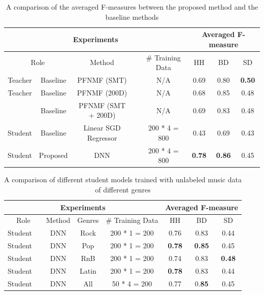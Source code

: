 \documentclass{article}
\begin{document}
\begin{table}
\centering
\begin{tabular}{ccccc|ccc}
\hline
\multicolumn{5}{c}{Experiments}                                                & \multicolumn{3}{c}{Averaged F-measure}           \\ \hline
\multicolumn{2}{c}{Role} & Method                  &  & \# Training Data & HH             & BD             & SD             \\ \hline
Teacher    & Baseline    & PFNMF (SMT)             &     & N/A              & 0.69          & 0.80           & \textbf{0.50} \\
Teacher    & Baseline    & PFNMF (200D)       &     & N/A              & 0.68          & 0.85          & 0.48          \\
           & Baseline    & PFNMF (SMT + 200D) &     & N/A              & 0.69          & 0.83          & 0.48          \\
Student    & Baseline    & Linear SGD Regressor    &     & 200 * 4 = 800    & 0.43          & 0.69           & 0.43          \\
Student    & Proposed    & DNN                     &     & 200 * 4 = 800    & \textbf{0.78} & \textbf{0.86} & 0.45          \\ \hline
\end{tabular}
\caption{A comparison of the averaged F-measures between the proposed method and the baseline methods}
\label{tab:all_results}
\end{table}

\begin{table}
\centering
\begin{tabular}{cccccccc}
\hline
\multicolumn{5}{c}{Experiments}                               & \multicolumn{3}{c}{Averaged F-measure}           \\ \hline
\multicolumn{2}{c}{Role} & Method & Genres & \# Training Data & HH             & BD             & SD             \\ \hline
Student    &             & DNN    & Rock   & 200 * 1 = 200    & 0.76          & 0.83          & 0.44          \\
Student    &             & DNN    & Pop    & 200 * 1 = 200    & \textbf{0.78} & \textbf{0.85} & 0.45          \\
Student    &             & DNN    & RnB    & 200 * 1 = 200    & 0.74          & 0.83          & \textbf{0.48} \\
Student    &             & DNN    & Latin  & 200 * 1 = 200    & \textbf{0.78} & 0.83          & 0.44          \\
Student    &             & DNN    & All     & 50 * 4 = 200     & 0.77          & 0.\textbf{85}          & 0.45          \\ \hline
\end{tabular}
\caption{A comparison of different student models trained with unlabeled music data of different genres}%
\label{tab:genre_results}
\end{table}
\end{document}
